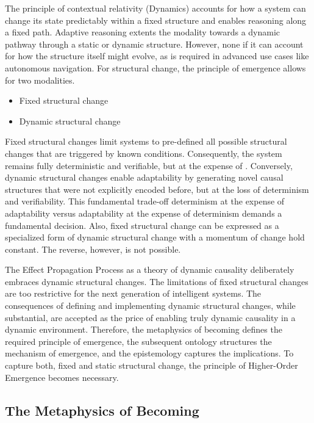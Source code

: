 The principle of contextual relativity (Dynamics) accounts for how a system can change its state predictably within a fixed structure and enables reasoning along a fixed path. Adaptive reasoning extents the  modality towards a dynamic pathway through a static or dynamic structure. However, none if it can account for how the structure itself might evolve, as is required in advanced use cases like autonomous navigation. For structural change, the principle of emergence allows for two modalities.

\begin{itemize}
	\item Fixed structural change
	\item Dynamic structural change
\end{itemize}

Fixed structural changes limit systems to pre-defined all possible structural changes that are triggered by known conditions.
Consequently, the system remains fully deterministic and verifiable, but at the expense of . 
Conversely, dynamic structural changes enable adaptability by  generating novel causal structures that were not explicitly encoded before,
but at the loss of determinism and verifiability. This fundamental trade-off determinism at the expense of adaptability versus
adaptability at the expense of  determinism demands a fundamental decision. Also, fixed structural change can be expressed 
as a specialized form of dynamic structural change with a momentum of change hold constant. The reverse, however, is not possible. 

The Effect Propagation Process as a theory of dynamic causality deliberately embraces dynamic structural changes.
The limitations of fixed structural changes are too restrictive for the next generation of intelligent systems.
The consequences of defining and implementing dynamic structural changes, while substantial, 
are accepted as the price of enabling truly dynamic causality in a dynamic environment. 
Therefore, the metaphysics of becoming defines the required principle of emergence, 
the subsequent ontology structures the mechanism of emergence, and the epistemology captures 
the implications. To capture both, fixed and static structural change, the principle of Higher-Order Emergence  becomes necessary. 

\subsection{The Metaphysics of Becoming} 
\label{sec:metaphysics_becoming}

